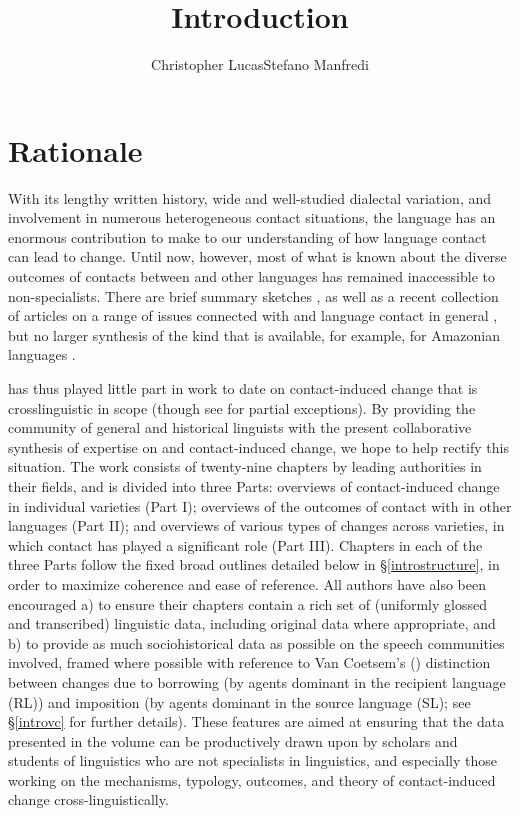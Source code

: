 \documentclass[output=paper]{langsci/langscibook}
\author{Christopher Lucas\affiliation{SOAS University of London}\lastand Stefano Manfredi\affiliation{CNRS, SeDyL}}
\title{Introduction}
\begin{document}
\label{introintro}

\section{Rationale}
With its lengthy written history, wide and well-studied dialectal variation, and involvement in numerous heterogeneous contact situations, the  language has an enormous contribution to make to our understanding of how language contact can lead to change. Until now, however, most of what is known about the diverse outcomes of contacts between  and other languages has remained inaccessible to non-specialists. There are brief summary sketches \citep{Versteegh2001article,Versteegh2010,Thomason2011,Manfredi2018}, as well as a recent collection of articles on a range of issues connected with  and language contact in general \citep{ManfrediTosco2018}, but no larger synthesis of the kind that is available, for example, for Amazonian languages \citep{Aikhenvald2002}.

 has thus played little part in work to date on contact-induced change that is crosslinguistic in
scope (though see \citealt{Matras2009,Trudgill2011} for partial exceptions). By providing the community of general and historical linguists with the present collaborative synthesis of expertise on  and contact-induced change, we hope to help rectify this situation. The work consists of twenty-nine chapters by leading authorities in their fields, and is divided into three Parts: overviews of contact-induced change in individual  varieties (Part I); overviews of the outcomes of contact with  in other languages (Part II); and overviews of various types of changes across  varieties, in which contact has played a significant role (Part III). Chapters in each of the three Parts follow the fixed broad outlines detailed below in §\ref{introstructure}, in order to maximize coherence and ease of reference. All authors have also been encouraged a) to ensure their chapters contain a rich set of (uniformly glossed and transcribed) linguistic data, including original data where appropriate, and b) to provide as much sociohistorical data as possible on the speech communities involved, framed where possible with reference to Van Coetsem’s (\citeyear{VanCoetsem1988,VanCoetsem2000}) distinction between changes due to borrowing (by agents dominant in the {recipient language} ({RL})) and {imposition} (by agents dominant in the {source language} ({SL}); see §\ref{introvc} for further details). These features are aimed at ensuring that the data presented in the volume can be productively drawn upon by scholars and students of linguistics who are not specialists in
 linguistics, and especially those working on the mechanisms, typology, outcomes, and theory of contact-induced change cross-linguistically.
\end{document}
